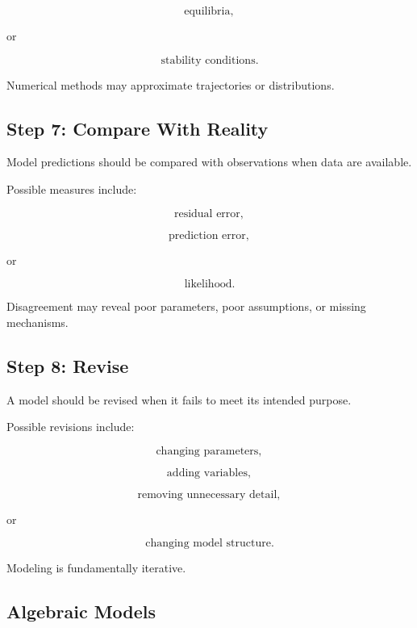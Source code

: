 \[
\boxed{
\text{equilibria},
}
\]

or

\[
\boxed{
\text{stability conditions}.
}
\]

Numerical methods may approximate trajectories or distributions.

\subsection{Step 7: Compare With Reality}
\label{subsec:model-compare-reality}

Model predictions should be compared with observations when data are
available.

Possible measures include:

\[
\boxed{
\text{residual error},
}
\]

\[
\boxed{
\text{prediction error},
}
\]

or

\[
\boxed{
\text{likelihood}.
}
\]

Disagreement may reveal poor parameters, poor assumptions, or missing
mechanisms.

\subsection{Step 8: Revise}
\label{subsec:model-revision}

A model should be revised when it fails to meet its intended purpose.

Possible revisions include:

\[
\boxed{
\text{changing parameters},
}
\]

\[
\boxed{
\text{adding variables},
}
\]

\[
\boxed{
\text{removing unnecessary detail},
}
\]

or

\[
\boxed{
\text{changing model structure}.
}
\]

Modeling is fundamentally iterative.

\subsection{Algebraic Models}
\label{subsec:algebraic-models}

